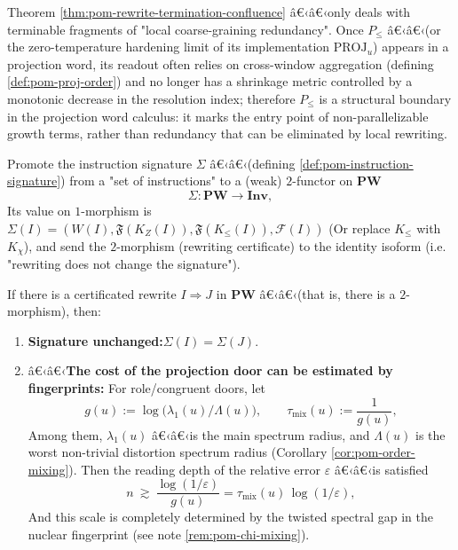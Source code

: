 \begin{remark}[Boundary: sequential projection \texorpdfstring{$P_{\le}$}{P<=} is not a locally deletable segment]\label{rem:pom-rewrite-boundary-order}
Theorem \ref{thm:pom-rewrite-termination-confluence} â€‹â€‹only deals with terminable fragments of "local coarse-graining redundancy".
Once $P_{\le}$ â€‹â€‹(or the zero-temperature hardening limit of its implementation $\mathrm{PROJ}_u$) appears in a projection word, its readout often relies on cross-window aggregation (defining \ref{def:pom-proj-order}) and no longer has a shrinkage metric controlled by a monotonic decrease in the resolution index; therefore $P_{\le}$ is a structural boundary in the projection word calculus: it marks the entry point of non-parallelizable growth terms, rather than redundancy that can be eliminated by local rewriting.
\end{remark}

\begin{definition}\label{def:pom-sigma-functor}
Promote the instruction signature $\Sigma$ â€‹â€‹(defining \ref{def:pom-instruction-signature}) from a "set of instructions" to a (weak) $2$-functor on $\mathbf{PW}$
\[
\Sigma:\mathbf{PW}\to \mathbf{Inv},
\]
Its value on $1$-morphism is
\(
\Sigma(I)=(W(I),\mathfrak F(K_Z(I)),\mathfrak F(K_{\le}(I)),\mathcal F(I))
\)
(Or replace $K_{\le}$ with $K_\chi$), and send the $2$-morphism (rewriting certificate) to the identity isoform (i.e. "rewriting does not change the signature").
\end{definition}

\begin{proposition}\label{prop:pom-rewrite-audit-loop}
If there is a certificated rewrite $I\Rightarrow J$ in $\mathbf{PW}$ â€‹â€‹(that is, there is a $2$-morphism), then:
\begin{enumerate}
  \item \textbf{Signature unchanged:}$\Sigma(I)=\Sigma(J)$.
  \item â€‹â€‹\textbf{The cost of the projection door can be estimated by fingerprints:} For role/congruent doors, let
  \[
  g(u):=\log\!\bigl(\lambda_1(u)/\Lambda(u)\bigr),
  \qquad
  \tau_{\mathrm{mix}}(u):=\frac{1}{g(u)},
  \]
  Among them, $\lambda_1(u)$ â€‹â€‹is the main spectrum radius, and $\Lambda(u)$ is the worst non-trivial distortion spectrum radius (Corollary \ref{cor:pom-order-mixing}).
  Then the reading depth of the relative error $\varepsilon$ â€‹â€‹is satisfied
  \[
  n\ \gtrsim\ \frac{\log(1/\varepsilon)}{g(u)}=\tau_{\mathrm{mix}}(u)\,\log(1/\varepsilon),
  \]
  And this scale is completely determined by the twisted spectral gap in the nuclear fingerprint (see note \ref{rem:pom-chi-mixing}).
\end{enumerate}
\end{proposition}

